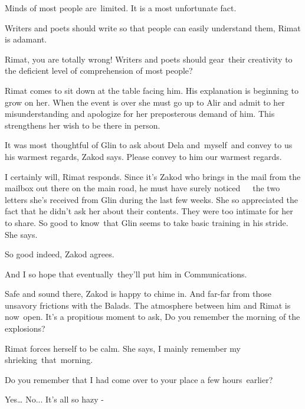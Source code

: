\documentclass[letterpaper]{article}
\begin{document}
{\textquotedbl}Minds of most people are~limited. It is a most unfortunate fact.{\textquotedbl} 

{\textquotedbl}Writers and poets should write so that people can easily understand them, {\textquotedbl} Rimat is
adamant.\ 

{\textquotedbl}Rimat, you are totally wrong! Writers and poets should gear~their creativity to the deficient level of
comprehension of most people?{\textquotedbl} 

Rimat comes to sit down at the table facing him. His explanation is beginning to grow on her. When the event is over she
must go up to Alir and admit to her misunderstanding and apologize for her preposterous demand of him. This strengthens
her wish to be there in person.\ \ 

{\textquotedbl}It was most\ thoughtful of Glin to ask about Dela and\textcolor{red}{\ }myself\ and convey to us his
warmest regards,{\textquotedbl} Zakod says. {\textquotedbl}Please convey to him our warmest regards.{\textquotedbl}

{\textquotedbl}I certainly will,{\textquotedbl} Rimat responds. Since it's Zakod who brings in the mail from the mailbox
out there on the main road, he must have surely noticed\ \ \ the two letters she's received from Glin during the last
few weeks. She so appreciated the fact that he didn't ask her about their contents. They were too intimate for her to
share. {\textquotedbl}So good to know\ that Glin seems to take basic training in his stride.{\textquotedbl} She says.\ 

{\textquotedbl}So good indeed,{\textquotedbl} Zakod agrees. 

{\textquotedbl}And I so hope that eventually\ they'll put him in Communications.{\textquotedbl} 

{\textquotedbl}Safe and sound there,{\textquotedbl} Zakod is happy to chime in. {\textquotedbl}And far-far from those
unsavory frictions with the Balads.{\textquotedbl} The atmosphere between him and Rimat is now\ open. It's a propitious
moment to ask, {\textquotedbl}Do you remember the morning of the explosions?{\textquotedbl} 

Rimat forces herself to be calm. She says, {\textquotedbl}I mainly remember my shrieking~that\ morning.{\textquotedbl} 

{\textquotedbl}Do you remember that I had come over to your place a few hours~earlier?{\textquotedbl} 

{\textquotedbl}Yes{\dots} No... It's all so hazy -{\textquotedbl} 
\end{document}
